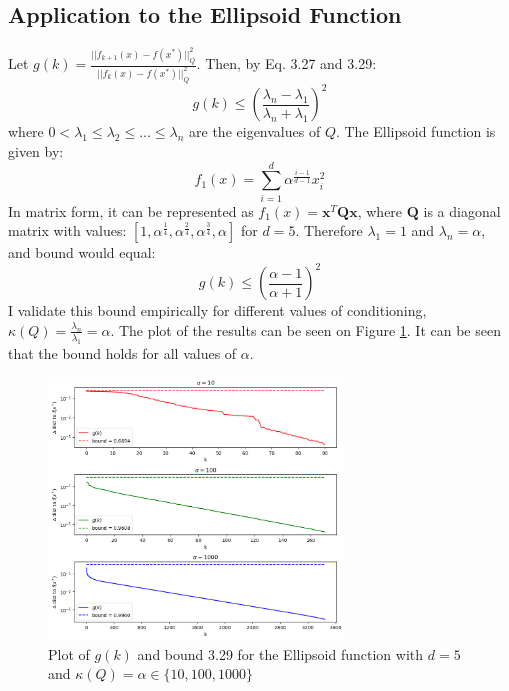 \documentclass[a4paper]{article}
\begin{document}
\subsection{Application to the Ellipsoid Function}
Let $g(k) = \frac{||f_{k+1}(x) - f(x^*)||_Q^2} {||f_{k}(x) - f(x^*)||_Q^2}$. Then, by
Eq. 3.27 and 3.29:
\[
g(k) \leq \left(\frac{\lambda_n-\lambda_1}{\lambda_n + \lambda_1}\right)^2
\]
where $0<\lambda_1\leq \lambda_2 \leq ... \leq \lambda_n$ are the eigenvalues of
$Q$. The Ellipsoid function is given by: 
\[
f_{1}(x)=\sum_{i=1}^{d} \alpha^{\frac{i-1}{d-1}} x_{i}^{2}
\]
In matrix form, it can be represented as $f_1(x) =\mathbf{x}^T\mathbf{Qx}$, where
$\mathbf{Q}$ is a diagonal matrix with values:
$[1, \alpha^{\frac{1}{4}}, \alpha^{\frac{2}{4}}, \alpha^{\frac{3}{4}}, \alpha]$
for $d=5$. Therefore $\lambda_1 = 1$ and $\lambda_n = \alpha$, and bound would
equal:
\[
g(k) \leq \left(\frac{\alpha-1}{\alpha + 1}\right)^2
\]
I validate this bound empirically for different values of conditioning,
$\kappa(Q) = \frac{\lambda_n}{\lambda_1} = \alpha$. The plot of
the results can be seen on Figure \ref{plt3}. It can be seen that the bound
holds for all values of $\alpha$.

\begin{figure}[]
    \centering
    \includegraphics[width=0.7\textwidth]{plt_bound.png}
    \caption{Plot of $g(k)$ and bound 3.29 for the Ellipsoid function with $d=5$ and $\kappa(Q) = \alpha \in \{10, 100, 1000\}$}
  \label{plt3}
\end{figure}
\end{document}
